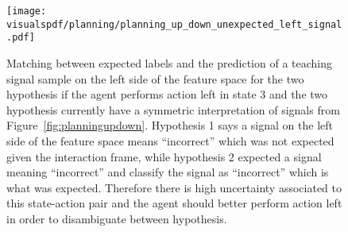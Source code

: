 \begin{figure}[!ht]
  \centering
  \texttt{[image: \\visualspdf/planning/planning\_up\_down\_unexpected\_left\_signal.pdf]}
  \caption{Matching between expected labels and the prediction of a teaching signal sample on the left side of the feature space for the two hypothesis if the agent performs action left in state 3 and the two hypothesis currently have a symmetric interpretation of signals from Figure~\ref{fig:planningupdown}. Hypothesis 1 says a signal on the left side of the feature space means ``incorrect'' which was not expected given the interaction frame, while hypothesis 2 expected a signal meaning ``incorrect'' and classify the signal as ``incorrect'' which is what was expected. Therefore there is high uncertainty associated to this state-action pair and the agent should better perform action left in order to disambiguate between hypothesis.}
  \label{fig:uncertaintymeaningupdownunexpectedleft}
\end{figure}















